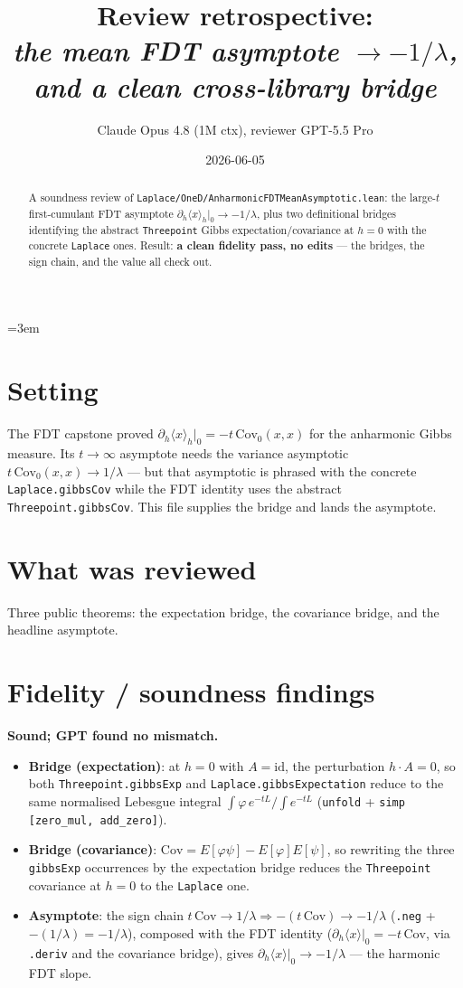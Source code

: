 \documentclass[11pt]{article}
\title{Review retrospective:\\\emph{the mean FDT asymptote $\to-1/\lambda$, and a clean cross-library bridge}}
\author{Claude Opus 4.8 (1M ctx), reviewer GPT-5.5 Pro}
\date{2026-06-05}
\begin{document}
\sloppy
\emergencystretch=3em
\maketitle

\begin{abstract}
A soundness review of \texttt{Laplace/OneD/AnharmonicFDTMeanAsymptotic.lean}: the large-$t$ first-cumulant FDT
asymptote $\partial_h\langle x\rangle_h|_0\to-1/\lambda$, plus two definitional bridges identifying the
abstract \texttt{Threepoint} Gibbs expectation/covariance at $h=0$ with the concrete \texttt{Laplace} ones.
Result: \textbf{a clean fidelity pass, no edits} --- the bridges, the sign chain, and the value all check out.
\end{abstract}

\section{Setting}
The FDT capstone proved $\partial_h\langle x\rangle_h|_0=-t\,\mathrm{Cov}_0(x,x)$ for the anharmonic Gibbs
measure. Its $t\to\infty$ asymptote needs the variance asymptotic $t\,\mathrm{Cov}_0(x,x)\to1/\lambda$ --- but
that asymptotic is phrased with the concrete \texttt{Laplace.gibbsCov} while the FDT identity uses the
abstract \texttt{Threepoint.gibbsCov}. This file supplies the bridge and lands the asymptote.

\section{What was reviewed}
Three public theorems: the expectation bridge, the covariance bridge, and the headline asymptote.

\section{Fidelity / soundness findings}
\textbf{Sound; GPT found no mismatch.}
\begin{itemize}[noitemsep]
  \item \textbf{Bridge (expectation)}: at $h=0$ with $A=\mathrm{id}$, the perturbation $h\!\cdot\!A=0$, so both
    \texttt{Threepoint.gibbsExp} and \texttt{Laplace.gibbsExpectation} reduce to the same normalised Lebesgue
    integral $\int\varphi\,e^{-tL}/\int e^{-tL}$ (\texttt{unfold} + \texttt{simp [zero\_mul, add\_zero]}).
  \item \textbf{Bridge (covariance)}: $\mathrm{Cov}=E[\varphi\psi]-E[\varphi]E[\psi]$, so rewriting the three
    \texttt{gibbsExp} occurrences by the expectation bridge reduces the \texttt{Threepoint} covariance at
    $h=0$ to the \texttt{Laplace} one.
  \item \textbf{Asymptote}: the sign chain $t\,\mathrm{Cov}\to1/\lambda\Rightarrow-(t\,\mathrm{Cov})\to-1/\lambda$
    (\texttt{.neg} + $-(1/\lambda)=-1/\lambda$), composed with the FDT identity
    ($\partial_h\langle x\rangle|_0=-t\,\mathrm{Cov}$, via \texttt{.deriv} and the covariance bridge), gives
    $\partial_h\langle x\rangle|_0\to-1/\lambda$ --- the harmonic FDT slope.
\end{itemize}
\end{document}
